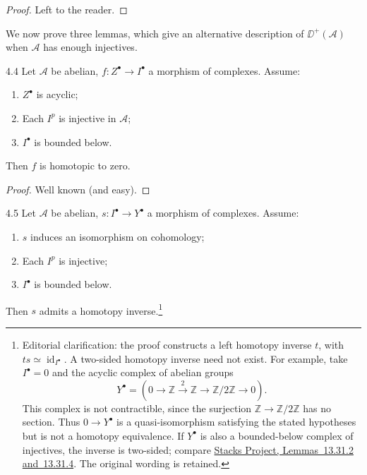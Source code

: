 \begin{proof}
Left to the reader.
\end{proof}

We now prove three lemmas, which give an alternative description of $\DD^+(\mathcal{A})$ when $\mathcal{A}$ has enough injectives.

\begin{booklemma}{4.4}\label{lem:1.4.4}
Let $\mathcal{A}$ be abelian, $f\colon Z^\bullet\to I^\bullet$ a morphism of complexes. Assume:
\begin{enumerate}
\item[(1)] $Z^\bullet$ is acyclic;
\item[(2)] Each $I^p$ is injective in $\mathcal{A}$;
\item[(3)] $I^\bullet$ is bounded below.
\end{enumerate}
Then $f$ is homotopic to zero.
\end{booklemma}
\begin{proof}
	Well known (and easy).
\end{proof}
\begin{booklemma}{4.5}\label{lem:1.4.5}
Let $\mathcal{A}$ be abelian, $s\colon I^\bullet\to Y^\bullet$ a morphism of complexes. Assume:
\begin{enumerate}
\item[(1)] $s$ induces an isomorphism on cohomology;
\item[(2)] Each $I^p$ is injective;
\item[(3)] $I^\bullet$ is bounded below.
\end{enumerate}
Then $s$ admits a homotopy inverse.\footnote{Editorial clarification: the proof constructs a left homotopy inverse $t$, with $ts\simeq\operatorname{id}_{I^\bullet}$. A two-sided homotopy inverse need not exist. For example, take $I^\bullet=0$ and the acyclic complex of abelian groups
\[
Y^\bullet=(0\longrightarrow\mathbb Z\xrightarrow{2}\mathbb Z\longrightarrow\mathbb Z/2\mathbb Z\longrightarrow0).
\]
This complex is not contractible, since the surjection $\mathbb Z\to\mathbb Z/2\mathbb Z$ has no section. Thus $0\to Y^\bullet$ is a quasi-isomorphism satisfying the stated hypotheses but is not a homotopy equivalence. If $Y^\bullet$ is also a bounded-below complex of injectives, the inverse is two-sided; compare \href{https://stacks.math.columbia.edu/tag/070G}{Stacks Project, Lemmas~13.31.2 and~13.31.4}. The original wording is retained.}
\end{booklemma}

